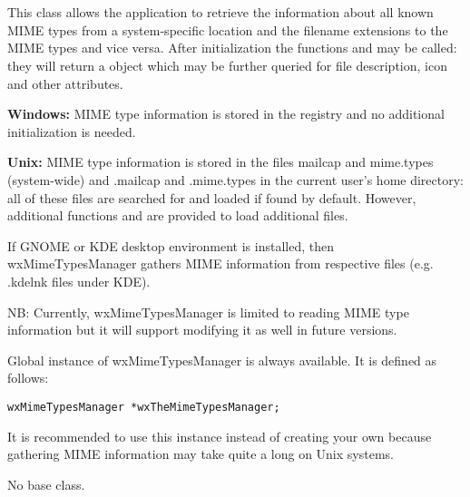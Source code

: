 \section{}\label{wxmimetypesmanager}

This class allows the application to retrieve the information about all known
MIME types from a system-specific location and the filename extensions to the
MIME types and vice versa. After initialization the functions
and  
may be called: they will return a  object which
may be further queried for file description, icon and other attributes.

{\bf Windows:} MIME type information is stored in the registry and no additional
initialization is needed.

{\bf Unix:} MIME type information is stored in the files mailcap and mime.types
(system-wide) and .mailcap and .mime.types in the current user's home directory:
all of these files are searched for and loaded if found by default. However,
additional functions 
 and 
 are
provided to load additional files.

If GNOME or KDE desktop environment is installed, then wxMimeTypesManager 
gathers MIME information from respective files (e.g. .kdelnk files under KDE).

NB: Currently, wxMimeTypesManager is limited to reading MIME type information
but it will support modifying it as well in future versions.


Global instance of wxMimeTypesManager is always available. It is defined
as follows:

\begin{verbatim}
wxMimeTypesManager *wxTheMimeTypesManager;
\end{verbatim}

It is recommended to use this instance instead of creating your own because
gathering MIME information may take quite a long on Unix systems.


No base class.


